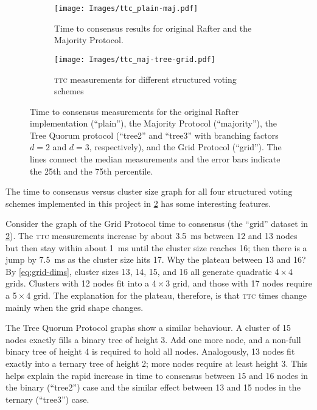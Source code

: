 \documentclass[11pt,chapterprefix=true,toc=bibliography,numbers=noendperiod,
               footnotes=multiple,twoside]{scrreprt}
\begin{document}

\begin{figure}[p]
    \begin{subfigure}{1\textwidth}
        \centering
        \texttt{[image: Images/ttc\_plain-maj.pdf]}
        \caption{Time to consensus results for original Rafter and the Majority Protocol.}
        \label{fig:plain-maj-ttc}
    \end{subfigure}

    \begin{subfigure}{1\textwidth}
        \centering
        \texttt{[image: Images/ttc\_maj-tree-grid.pdf]}
        \caption{\textsc{ttc} measurements for different structured voting schemes}
        \label{fig:maj-tree-grid-ttc}
    \end{subfigure}
    \caption{Time to consensus measurements for the original Rafter implementation (\enquote{plain}), the Majority Protocol (\enquote{majority}), the Tree Quorum protocol (\enquote{tree2} and \enquote{tree3} with branching factors \(d = 2\) and \(d = 3\), respectively), and the Grid Protocol (\enquote{grid}). The lines connect the median measurements and the error bars indicate the 25th and the 75th percentile.}
    \label{fig:ttc}
\end{figure}

The time to consensus versus cluster size graph for all four structured voting schemes implemented in this project in \cref{fig:maj-tree-grid-ttc} has some interesting features.

Consider the graph of the Grid Protocol time to consensus (the \enquote{grid} dataset in \cref{fig:maj-tree-grid-ttc}). The \textsc{ttc} measurements increase by about \SI{3.5}{\milli\second} between 12 and 13 nodes but then stay within about \SI{1}{\milli\second} until the cluster size reaches 16; then there is a jump by \SI{7.5}{\milli\second} as the cluster size hits 17. Why the plateau between 13 and 16? By \cref{eq:grid-dims}, cluster sizes 13, 14, 15, and 16 all generate quadratic 4\,\(\times\)\,4 grids. Clusters with 12 nodes fit into a 4\,\(\times\)\,3 grid, and those with 17 nodes require a 5\,\(\times\)\,4 grid. The explanation for the plateau, therefore, is that \textsc{ttc} times change mainly when the grid shape changes.

The Tree Quorum Protocol graphs show a similar behaviour. A cluster of 15 nodes exactly fills a binary tree of height 3. Add one more node, and a non-full binary tree of height 4 is required to hold all nodes. Analogously, 13 nodes fit exactly into a ternary tree of height 2; more nodes require at least height 3. This helps explain the rapid increase in time to consensus between 15 and 16 nodes in the binary (\enquote{tree2}) case and the similar effect between 13 and 15 nodes in the ternary (\enquote{tree3}) case.
\end{document}
